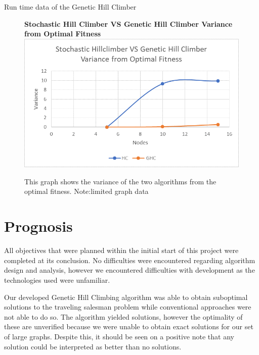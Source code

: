 \documentclass[sigplan,screen]{acmart}
\begin{document}
\begin{table}[h]
    \centering
    
    \caption{Run time data of the Genetic Hill Climber}
    \label{table:ghc_table}
\end{table}

\begin{figure}[h]
    \centering
    \textbf{Stochastic Hill Climber VS Genetic Hill Climber Variance from Optimal Fitness}
    \includegraphics[width=\columnwidth]{assets/hc_vs_ghc_variance.png}
    \caption{This graph shows the variance of the two algorithms from the optimal fitness. Note:limited graph data}
    \label{fig:variance}
\end{figure}

\clearpage
\section{Prognosis}
All objectives that were planned within the initial start of this project were
completed at its conclusion. No difficulties were encountered regarding
algorithm design and analysis, however we encountered difficulties with
development as the technologies used were unfamiliar.

Our developed Genetic Hill Climbing algorithm was able to obtain suboptimal
solutions to the traveling salesman problem while conventional approaches were
not able to do so. The algorithm yielded solutions, however the optimality of
these are unverified because we were unable to obtain exact solutions for our
set of large graphs. Despite this, it should be seen on a positive note that any
solution could be interpreted as better than no solutions.
\end{document}
